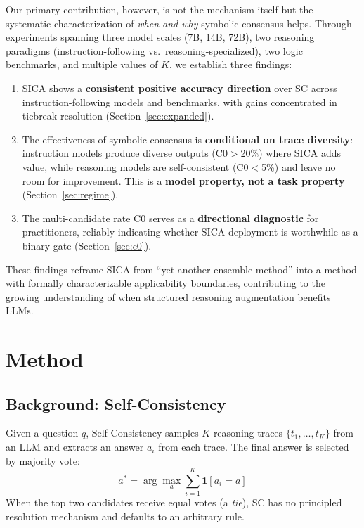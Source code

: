 \documentclass[11pt,a4paper]{article}
\begin{document}
Our primary contribution, however, is not the mechanism itself but the systematic characterization of \emph{when and why} symbolic consensus helps. Through experiments spanning three model scales (7B, 14B, 72B), two reasoning paradigms (instruction-following vs.\ reasoning-specialized), two logic benchmarks, and multiple values of $K$, we establish three findings:

\begin{enumerate}
    \item SICA shows a \textbf{consistent positive accuracy direction} over SC across instruction-following models and benchmarks, with gains concentrated in tiebreak resolution (Section~\ref{sec:expanded}).
    \item The effectiveness of symbolic consensus is \textbf{conditional on trace diversity}: instruction models produce diverse outputs (C0$>$20\%) where SICA adds value, while reasoning models are self-consistent (C0$<$5\%) and leave no room for improvement. This is a \textbf{model property, not a task property} (Section~\ref{sec:regime}).
    \item The multi-candidate rate C0 serves as a \textbf{directional diagnostic} for practitioners, reliably indicating whether SICA deployment is worthwhile as a binary gate (Section~\ref{sec:c0}).
\end{enumerate}

These findings reframe SICA from ``yet another ensemble method'' into a method with formally characterizable applicability boundaries, contributing to the growing understanding of when structured reasoning augmentation benefits LLMs.

\section{Method}
\label{sec:method}

\subsection{Background: Self-Consistency}

Given a question $q$, Self-Consistency samples $K$ reasoning traces $\{t_1, \ldots, t_K\}$ from an LLM and extracts an answer $a_i$ from each trace. The final answer is selected by majority vote:
\begin{equation}
    a^* = \arg\max_{a} \sum_{i=1}^{K} \mathbf{1}[a_i = a]
\end{equation}
When the top two candidates receive equal votes (a \emph{tie}), SC has no principled resolution mechanism and defaults to an arbitrary rule.
\end{document}
